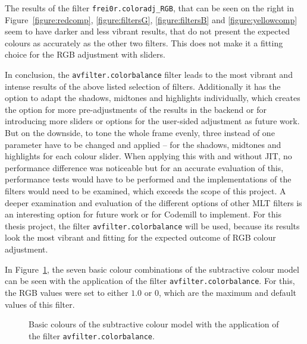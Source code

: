 \documentclass[../MasterThesis.tex]{subfiles}
\begin{document}
The results of the filter \texttt{frei0r.coloradj\_RGB}, that can be seen on the right in Figure~\ref{figure:redcomp}, \ref{figure:filtersG}, \ref{figure:filtersB} and \ref{figure:yellowcomp} seem to have darker and less vibrant results, that do not present the expected colours as accurately as the other two filters. This does not make it a fitting choice for the RGB adjustment with sliders.


In conclusion, the \texttt{avfilter.colorbalance} filter leads to the most vibrant and intense results of the above listed selection of filters. Additionally it has the option to adapt the shadows, midtones and highlights individually, which creates the option for more pre-adjustments of the results in the backend or for introducing more sliders or options for the user-sided adjustment as future work.
But on the downside, to tone the whole frame evenly, three instead of one parameter have to be changed and applied -- for the shadows, midtones and highlights for each colour slider.
When applying this with and without JIT, no performance difference was noticeable but for an accurate evaluation of this, performance tests would have to be performed and the implementations of the filters would need to be examined, which exceeds the scope of this project.
%
A deeper examination and evaluation of the different options of other MLT filters is an interesting option for future work or for Codemill to implement. For this thesis project, the filter \texttt{avfilter.colorbalance} will be used, because its results look the most vibrant and fitting for the expected outcome of RGB colour adjustment.

In Figure~\ref{figure:septopus}, the seven basic colour combinations of the subtractive colour model can be seen with the application of the filter \texttt{avfilter.colorbalance}. For this, the RGB values were set to either $1.0$ or $0$, which are the maximum and default values of this filter. 



\begin{figure}[H]
	\begin{center}
		\caption[Basic colours with the application of the filter \texttt{avfilter.colorbalance}.]{Basic colours of the subtractive colour model with the application of the filter \texttt{avfilter.colorbalance}.}
		\label{figure:septopus}
	\end{center}
\end{figure}
\end{document}

